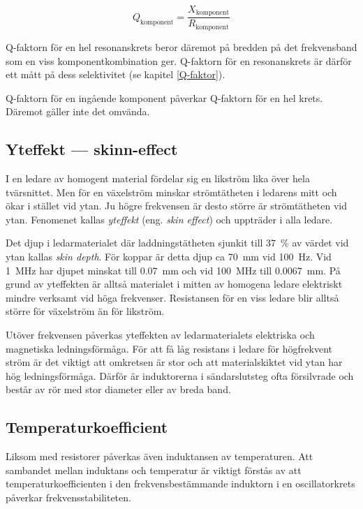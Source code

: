 \[Q_\text{komponent} = \dfrac{X_\text{komponent}}{R_\text{komponent}}\]

Q-faktorn för en hel resonanskrets beror däremot på bredden på det
frekvensband som en viss komponentkombination ger.
Q-faktorn för en resonanskrets är därför ett mått på dess
selektivitet (se kapitel \ref{Q-faktor}).

Q-faktorn för en ingående komponent påverkar Q-faktorn för en hel krets.
Däremot gäller inte det omvända.

\subsection{Yteffekt --- skinn-effect}

I en ledare av homogent material fördelar sig en likström lika över hela
tvärsnittet. Men för en växelström minskar strömtätheten i ledarens mitt
och ökar i stället vid ytan.
Ju högre frekvensen är desto större är strömtätheten vid ytan.
Fenomenet kallas \emph{yteffekt} (eng. \emph{skin effect}) och uppträder i alla
ledare.

Det djup i ledarmaterialet där laddningstätheten sjunkit till \SI{37}{\percent}
av värdet vid ytan kallas \emph{skin depth}.
För koppar är detta djup ca \SI{70}{\milli\metre} vid \SI{100}{\hertz}.
Vid \SI{1}{\mega\hertz} har djupet minskat till \SI{0,07}{\milli\metre} och vid
\SI{100}{\mega\hertz} till \SI{0,0067}{\milli\metre}.
På grund av yteffekten är alltså materialet i mitten av homogena
ledare elektriskt mindre verksamt vid höga frekvenser. Resistansen för en viss ledare 
blir alltså större för växelström än för likström.

Utöver frekvensen påverkas yteffekten av ledarmaterialets elektriska och
magnetiska ledningsförmåga. För att få låg resistans i ledare för högfrekvent
ström är det viktigt att omkretsen är stor och att materialskiktet vid ytan har
hög ledningsförmåga. Därför är induktorerna i sändarslutsteg ofta 
försilvrade och består av rör med stor diameter eller av breda band.

\subsection{Temperaturkoefficient}

Liksom med resistorer påverkas även induktansen av temperaturen. Att sambandet
mellan induktans och temperatur är viktigt förstås av att
temperaturkoefficienten i den frekvensbestämmande induktorn i en oscillatorkrets
påverkar frekvensstabiliteten.

